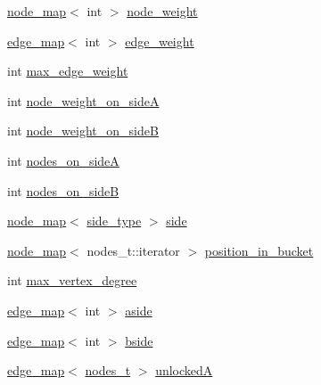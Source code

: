 \begin{DoxyCompactItemize}
\item 
\mbox{\hyperlink{classnode__map}{node\+\_\+map}}$<$ int $>$ \mbox{\hyperlink{classratio__cut__partition_a4d9d2a9317a062f839ea7155c37b173f}{node\+\_\+weight}}
\item 
\mbox{\hyperlink{classedge__map}{edge\+\_\+map}}$<$ int $>$ \mbox{\hyperlink{classratio__cut__partition_a48a85c82fb09b83c9d494d6d1232fab2}{edge\+\_\+weight}}
\item 
int \mbox{\hyperlink{classratio__cut__partition_a74193c82e8dc7d997780613378919106}{max\+\_\+edge\+\_\+weight}}
\item 
int \mbox{\hyperlink{classratio__cut__partition_af1b839e48e498cf8ca93c8ec5df8a686}{node\+\_\+weight\+\_\+on\+\_\+sideA}}
\item 
int \mbox{\hyperlink{classratio__cut__partition_aa16d1b508db86eb0ba4824642394999a}{node\+\_\+weight\+\_\+on\+\_\+sideB}}
\item 
int \mbox{\hyperlink{classratio__cut__partition_a7de51193b63e241afe263345479580ee}{nodes\+\_\+on\+\_\+sideA}}
\item 
int \mbox{\hyperlink{classratio__cut__partition_a6b797912a7653537473e0e583a3f245a}{nodes\+\_\+on\+\_\+sideB}}
\item 
\mbox{\hyperlink{classnode__map}{node\+\_\+map}}$<$ \mbox{\hyperlink{classratio__cut__partition_ace53442bd0c1e21fbf00858ec6f6b456}{side\+\_\+type}} $>$ \mbox{\hyperlink{classratio__cut__partition_a2bf913d1d8607747885177a3b585e611}{side}}
\item 
\mbox{\hyperlink{classnode__map}{node\+\_\+map}}$<$ nodes\+\_\+t\+::iterator $>$ \mbox{\hyperlink{classratio__cut__partition_a871af9a7ed4cb1c101e6620ff99cb8d7}{position\+\_\+in\+\_\+bucket}}
\item 
int \mbox{\hyperlink{classratio__cut__partition_ab07041983ab24ac059e8c98192c146e4}{max\+\_\+vertex\+\_\+degree}}
\item 
\mbox{\hyperlink{classedge__map}{edge\+\_\+map}}$<$ int $>$ \mbox{\hyperlink{classratio__cut__partition_a112bfcfb9d05d5bbdeb29576a61399e1}{aside}}
\item 
\mbox{\hyperlink{classedge__map}{edge\+\_\+map}}$<$ int $>$ \mbox{\hyperlink{classratio__cut__partition_ab9c1166efb1cbb65ff6c55bb6e3c9e6d}{bside}}
\item 
\mbox{\hyperlink{classedge__map}{edge\+\_\+map}}$<$ \mbox{\hyperlink{edge_8h_a22ac17689106ba21a84e7bc54d1199d6}{nodes\+\_\+t}} $>$ \mbox{\hyperlink{classratio__cut__partition_a9e4d0ba86475bd0faa98e01c6be4dde0}{unlockedA}}
\item 

\end{DoxyCompactItemize}
